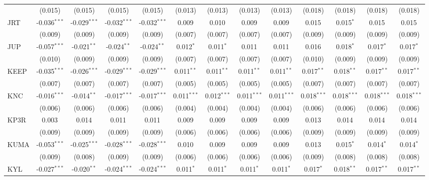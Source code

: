 \begin{table}[!htbp]
\begin{tabular}{@{\extracolsep{5pt}}lcccccccccccc}
  & (0.015) & (0.015) & (0.015) & (0.015) & (0.013) & (0.013) & (0.013) & (0.013) & (0.018) & (0.018) & (0.018) & (0.018) \\
 JRT & -0.036$^{***}$ & -0.029$^{***}$ & -0.032$^{***}$ & -0.032$^{***}$ & 0.009$^{}$ & 0.010$^{}$ & 0.009$^{}$ & 0.009$^{}$ & 0.015$^{}$ & 0.015$^{*}$ & 0.015$^{}$ & 0.015$^{}$ \\
  & (0.009) & (0.009) & (0.009) & (0.009) & (0.007) & (0.007) & (0.007) & (0.007) & (0.009) & (0.009) & (0.009) & (0.009) \\
 JUP & -0.057$^{***}$ & -0.021$^{**}$ & -0.024$^{**}$ & -0.024$^{**}$ & 0.012$^{*}$ & 0.011$^{*}$ & 0.011$^{}$ & 0.011$^{}$ & 0.016$^{}$ & 0.018$^{*}$ & 0.017$^{*}$ & 0.017$^{*}$ \\
  & (0.010) & (0.009) & (0.009) & (0.009) & (0.007) & (0.007) & (0.007) & (0.007) & (0.010) & (0.009) & (0.009) & (0.009) \\
 KEEP & -0.035$^{***}$ & -0.026$^{***}$ & -0.029$^{***}$ & -0.029$^{***}$ & 0.011$^{**}$ & 0.011$^{**}$ & 0.011$^{**}$ & 0.011$^{**}$ & 0.017$^{**}$ & 0.018$^{**}$ & 0.017$^{**}$ & 0.017$^{**}$ \\
  & (0.007) & (0.007) & (0.007) & (0.007) & (0.005) & (0.005) & (0.005) & (0.005) & (0.007) & (0.007) & (0.007) & (0.007) \\
 KNC & -0.016$^{***}$ & -0.014$^{**}$ & -0.017$^{***}$ & -0.017$^{***}$ & 0.011$^{***}$ & 0.012$^{***}$ & 0.011$^{***}$ & 0.011$^{***}$ & 0.018$^{***}$ & 0.018$^{***}$ & 0.018$^{***}$ & 0.018$^{***}$ \\
  & (0.006) & (0.006) & (0.006) & (0.006) & (0.004) & (0.004) & (0.004) & (0.004) & (0.006) & (0.006) & (0.006) & (0.006) \\
 KP3R & 0.003$^{}$ & 0.014$^{}$ & 0.011$^{}$ & 0.011$^{}$ & 0.009$^{}$ & 0.009$^{}$ & 0.009$^{}$ & 0.009$^{}$ & 0.013$^{}$ & 0.014$^{}$ & 0.014$^{}$ & 0.014$^{}$ \\
  & (0.009) & (0.009) & (0.009) & (0.009) & (0.006) & (0.006) & (0.006) & (0.006) & (0.009) & (0.009) & (0.009) & (0.009) \\
 KUMA & -0.053$^{***}$ & -0.025$^{***}$ & -0.028$^{***}$ & -0.028$^{***}$ & 0.010$^{}$ & 0.009$^{}$ & 0.009$^{}$ & 0.009$^{}$ & 0.013$^{}$ & 0.015$^{*}$ & 0.014$^{*}$ & 0.014$^{*}$ \\
  & (0.009) & (0.008) & (0.009) & (0.009) & (0.006) & (0.006) & (0.006) & (0.006) & (0.009) & (0.008) & (0.008) & (0.008) \\
 KYL & -0.027$^{***}$ & -0.020$^{**}$ & -0.024$^{***}$ & -0.024$^{***}$ & 0.011$^{*}$ & 0.011$^{*}$ & 0.011$^{*}$ & 0.011$^{*}$ & 0.017$^{*}$ & 0.018$^{**}$ & 0.017$^{**}$ & 0.017$^{**}$ \\

\end{tabular}
\end{table}
